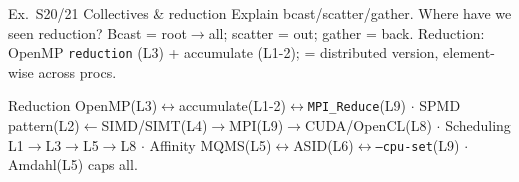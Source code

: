 \begin{example2}{Ex.\ S20/21 Collectives \& reduction}
    Explain bcast/scatter/gather. Where have we seen reduction?
    \tcblower
    Bcast = root$\to$all; scatter = out; gather = back. Reduction: OpenMP \texttt{reduction} (L3) + accumulate (L1-2);  = distributed version, element-wise across procs.
\end{example2}

\begin{remark}
     Reduction OpenMP(L3)$\leftrightarrow$accumulate(L1-2)$\leftrightarrow$\texttt{MPI\_Reduce}(L9) $\cdot$ SPMD pattern(L2)$\leftarrow$SIMD/SIMT(L4)$\to$MPI(L9)$\to$CUDA/OpenCL(L8) $\cdot$ Scheduling L1$\to$L3$\to$L5$\to$L8 $\cdot$ Affinity MQMS(L5)$\leftrightarrow$ASID(L6)$\leftrightarrow$\texttt{--cpu-set}(L9) $\cdot$ Amdahl(L5) caps all.
\end{remark}
